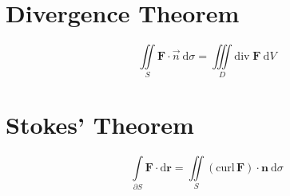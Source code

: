 \documentclass[12pt, fleqn]{book}
\newcommand{\D}{\mathrm{d}}
\newcommand{\iis}{\iint\limits_S}
\newcommand{\F}{\mathbf{F}}
\newcommand{\br}{\mathbf{r}}
\newcommand{\Curl}{\mathrm{curl}}
\newcommand{\Div}{\mathrm{div}}
\begin{document}
	\section{Divergence Theorem}
		\begin{equation}
			\iis \F \cdot \vec{n} \ \D \sigma = \iiint\limits_D \Div \; \F \ \D V
		\end{equation}
	\section{Stokes' Theorem}
		\begin{equation}
			\int\limits_{\partial S} \F \cdot \D \br = \iint\limits_S \left(\Curl \, \F\right) \cdot \mathbf{n} \ \D \sigma
		\end{equation}
\end{document}

